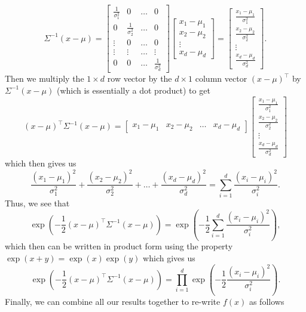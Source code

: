 \documentclass [10pt]{article}
\begin{document}
\begin{enumerate}
	\[
	\Sigma^{-1}(x-\mu)=
	\begin{bmatrix}
		\frac{1}{\sigma_{1}^{2}} & 0 & \dots & 0 \\
		0 & \frac{1}{\sigma_{2}^{2}} & \dots & 0 \\
		\vdots & 0 & \dots & 0 \\
		\vdots & \vdots & \dots & \vdots \\
		0 & 0 & \dots & \frac{1}{\sigma_{d}^{2}}
	\end{bmatrix}
	\begin{bmatrix}
		x_{1} - \mu_{1} \\
		x_{2} - \mu_{2} \\
		\vdots \\
		x_{d} - \mu_{d}
	\end{bmatrix}
	=
	\begin{bmatrix}
		\frac{x_{1} - \mu_{1}}{\sigma_{1}^{2}} \\
		\frac{x_{2} - \mu_{2}}{\sigma_{2}^{2}} \\
		\vdots \\
		\frac{x_{d} - \mu_{d}}{\sigma_{d}^{2}}
	\end{bmatrix}.
	\]
	Then we multiply the $1\times d$ row vector by the $d\times 1$ column vector $(x-\mu)^{\top}$ by $\Sigma^{-1}(x-\mu)$ (which is essentially a dot product) to get
	\[
	(x-\mu)^{\top}\Sigma^{-1}(x-\mu)=
	\begin{bmatrix}
		x_{1} - \mu_{1} & x_{2} - \mu_{2} & \dots & x_{d}- \mu_{d}
	\end{bmatrix}
	\begin{bmatrix}
		\frac{x_{1} - \mu_{1}}{\sigma_{1}^{2}} \\
		\frac{x_{2} - \mu_{2}}{\sigma_{2}^{2}} \\
		\vdots \\
		\frac{x_{d} - \mu_{d}}{\sigma_{d}^{2}}
	\end{bmatrix}
	\]
	which then gives us$$\frac{(x_{1} - \mu_{1})^{2}}{\sigma_{1}^{2}}+\frac{(x_{2} - \mu_{2})^{2}}{\sigma_{2}^{2}}+\dots+\frac{(x_{d} - \mu_{d})^{2}}{\sigma_{d}^{2}}=\sum_{i=1}^{d}\frac{(x_{i} - \mu_{i})^{2}}{\sigma_{i}^{2}}.$$Thus, we see that$$\exp(-\frac{1}{2}(x-\mu)^{\top}\Sigma^{-1}(x-\mu))=\exp(-\frac{1}{2}\sum_{i=1}^{d}\frac{(x_{i} - \mu_{i})^{2}}{\sigma_{i}^{2}}),$$which then can be written in product form using the property $\exp(x+y)=\exp(x)\exp(y)$ which gives us$$\exp(-\frac{1}{2}(x-\mu)^{\top}\Sigma^{-1}(x-\mu))=\prod_{i=1}^{d}\exp(-\frac{1}{2}\frac{(x_{i}-\mu_{i})^{2}}{\sigma_{i}^{2}}).$$Finally, we can combine all our results together to re-write $f(x)$ as follows

\end{enumerate}
\end{document}
